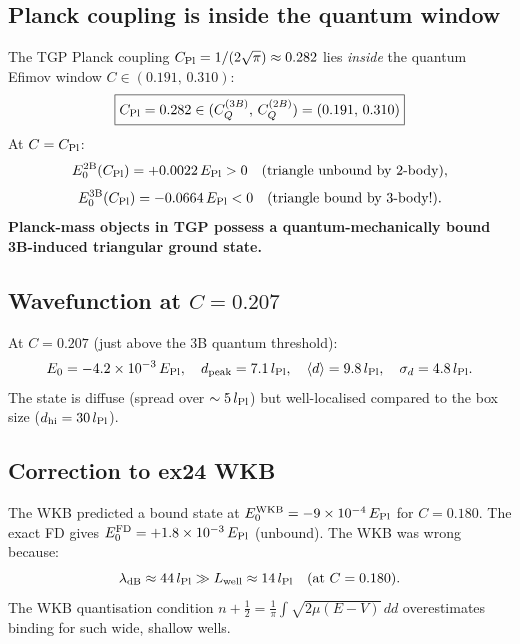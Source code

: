 \subsection{Planck coupling is inside the quantum window}

The TGP Planck coupling $C_{\rm Pl}=1/(2\sqrt{\pi})\approx0.282$
lies \emph{inside} the quantum Efimov window $C\in(0.191,\,0.310)$:
\begin{equation}
  \boxed{C_{\rm Pl} = 0.282 \in (C_Q^{(3B)},\,C_Q^{(2B)}) = (0.191,\,0.310)}
\end{equation}
At $C=C_{\rm Pl}$:
\begin{equation}
  E_0^{\rm 2B}(C_{\rm Pl}) = +0.0022\,E_{\rm Pl} > 0
    \quad\text{(triangle unbound by 2-body)},
\end{equation}
\begin{equation}
  E_0^{\rm 3B}(C_{\rm Pl}) = -0.0664\,E_{\rm Pl} < 0
    \quad\text{(triangle bound by 3-body!)}.
\end{equation}
\textbf{Planck-mass objects in TGP possess a quantum-mechanically
bound 3B-induced triangular ground state.}

\subsection{Wavefunction at \texorpdfstring{$C=0.207$}{C=0.207}}

At $C=0.207$ (just above the 3B quantum threshold):
\begin{equation}
  E_0 = -4.2\times10^{-3}\,E_{\rm Pl},\quad
  d_{\rm peak} = 7.1\,l_{\rm Pl},\quad
  \langle d\rangle = 9.8\,l_{\rm Pl},\quad
  \sigma_d = 4.8\,l_{\rm Pl}.
\end{equation}
The state is diffuse (spread over $\sim5\,l_{\rm Pl}$) but well-localised
compared to the box size ($d_{\rm hi}=30\,l_{\rm Pl}$).

\subsection{Correction to ex24 WKB}

The WKB predicted a bound state at $E_0^{\rm WKB}=-9\times10^{-4}\,E_{\rm Pl}$
for $C=0.180$.  The exact FD gives $E_0^{\rm FD}=+1.8\times10^{-3}\,E_{\rm Pl}$
(unbound).  The WKB was wrong because:
\begin{equation}
  \lambda_{\rm dB} \approx 44\,l_{\rm Pl} \gg L_{\rm well}\approx14\,l_{\rm Pl}
  \quad\text{(at } C=0.180\text{)}.
\end{equation}
The WKB quantisation condition $n+\tfrac{1}{2}=\frac{1}{\pi}\int\sqrt{2\mu(E-V)}\,dd$
overestimates binding for such wide, shallow wells.

